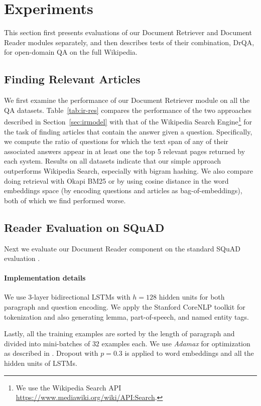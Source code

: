 \documentclass[11pt,a4paper]{article}
\newcommand\us{DrQA\xspace}
\newcommand\usr{Document Retriever\xspace}
\newcommand\usp{Document Reader\xspace}
\begin{document}
\section{Experiments} \label{sec:exp}

This section first presents evaluations of our Document Retriever and Document Reader modules separately, and then describes tests of their combination, \us, for open-domain QA on the full Wikipedia.

\subsection{Finding Relevant Articles}
We first examine the performance of our \usr module on all the QA datasets. Table~\ref{tab:ir-res} compares the performance of the two approaches described in Section~\ref{sec:irmodel} with that of the Wikipedia Search Engine\footnote{We use the Wikipedia Search API \url{https://www.mediawiki.org/wiki/API:Search}.} for the task of finding articles that contain the answer given a question.
%
Specifically, we compute the ratio of questions for which the text span of any of their associated answers appear in at least one the top 5 relevant pages returned by each system.
%
Results on all datasets indicate that our simple approach outperforms Wikipedia Search, especially with bigram hashing.
%
We also compare doing retrieval with Okapi BM25 or by using cosine distance in the word embeddings space (by encoding questions and articles as bag-of-embeddings), both of which we find performed worse.


\subsection{Reader Evaluation on SQuAD}
Next we evaluate our \usp component on the standard SQuAD evaluation \cite{rajpurkar2016squad}.
\paragraph{Implementation details}
We use $3$-layer bidirectional LSTMs with $h = 128$ hidden units for both paragraph and question encoding.
%
We apply the Stanford CoreNLP toolkit \cite{manning2014stanford} for tokenization and also generating lemma, part-of-speech, and named entity tags.

Lastly, all the training examples are sorted by the length of paragraph and divided into mini-batches of $32$ examples each. We use \emph{Adamax} for optimization as described in \cite{kingma2014adam}. Dropout with $p = 0.3$ is applied to word embeddings and all the hidden units of LSTMs.
\end{document}
